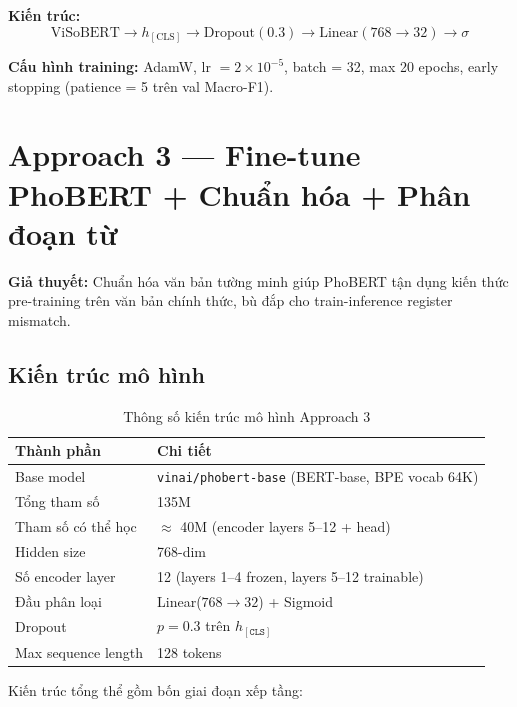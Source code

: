 \documentclass[12pt, a4paper]{report}
\begin{document}
\textbf{Kiến trúc:}
\begin{equation}
  \text{ViSoBERT} \rightarrow h_{[\text{CLS}]} \rightarrow \text{Dropout}(0.3)
  \rightarrow \text{Linear}(768 \rightarrow 32) \rightarrow \sigma
\end{equation}

\textbf{Cấu hình training:} AdamW, lr $= 2 \times 10^{-5}$,
batch = 32, max 20 epochs, early stopping (patience = 5 trên val Macro-F1).

\section{Approach 3 — Fine-tune PhoBERT + Chuẩn hóa + Phân đoạn từ}
\label{sec:approach3}

\textbf{Giả thuyết:} Chuẩn hóa văn bản tường minh giúp PhoBERT
tận dụng kiến thức pre-training trên văn bản chính thức,
bù đắp cho train-inference register mismatch.

\subsection{Kiến trúc mô hình}
\label{subsec:approach3_arch}

\begin{table}[H]
\centering
\caption{Thông số kiến trúc mô hình Approach 3}
\label{tab:arch_params}
\begin{tabular}{ll}
\toprule
\textbf{Thành phần} & \textbf{Chi tiết} \\
\midrule
Base model          & \texttt{vinai/phobert-base} (BERT-base, BPE vocab 64K) \\
Tổng tham số        & 135M \\
Tham số có thể học  & $\approx$ 40M (encoder layers 5--12 + head) \\
Hidden size         & 768-dim \\
Số encoder layer    & 12 (layers 1--4 frozen, layers 5--12 trainable) \\
Đầu phân loại       & Linear($768 \rightarrow 32$) + Sigmoid \\
Dropout             & $p=0.3$ trên $h_{[\texttt{CLS}]}$ \\
Max sequence length & 128 tokens \\
\bottomrule
\end{tabular}
\end{table}

Kiến trúc tổng thể gồm bốn giai đoạn xếp tầng:
\end{document}
